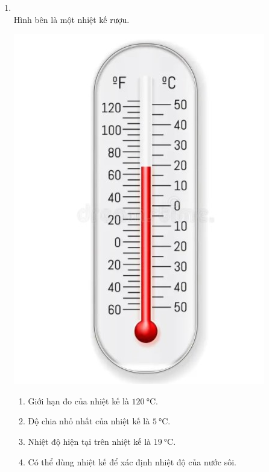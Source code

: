 \begin{enumerate}[label=\bfseries Câu \arabic*:, leftmargin=1.7cm]
\item {}\\
Hình bên là một nhiệt kế rượu.
\begin{center}
	\includegraphics[width=0.25\linewidth]{../figs/VN12-Y24-PH-SYL-002P-2}
\end{center}
\begin{enumerate}[label=\alph*)]
	\item Giới hạn đo của nhiệt kế là $\SI{120}{\celsius}$.
	\item Độ chia nhỏ nhất của nhiệt kế là $\SI{5}{\celsius}$.
	\item Nhiệt độ hiện tại trên nhiệt kế là $\SI{19}{\celsius}$.
	\item Có thể dùng nhiệt kế để xác định nhiệt độ của nước sôi.
\end{enumerate}


\end{enumerate}

